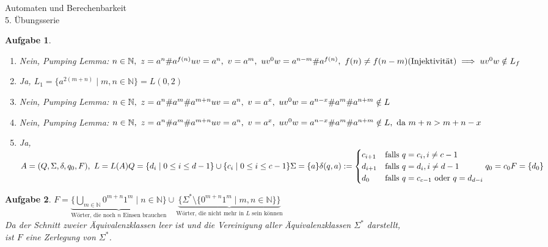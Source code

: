 \documentclass[11pt]{article}
\theoremstyle{break}
\newtheorem{task}{Aufgabe}
\begin{document}
\begin{center}
\Large{Automaten und Berechenbarkeit}\\
\large{5. Übungsserie}
\end{center}

\begin{task}
    \hfill\vspace{-5mm}
    \begin{enumerate} [label={(\alph*)}]
        \item Nein, Pumping Lemma: $n\in \mathbb{N},\ z = a^n \# a^{f(n)}\\ uv = a^n,\ v = a^m,\ uv^0 w = a^{n-m}\# a^{f(n)},\ f(n)\neq f(n-m)(\text{Injektivität})\implies uv^0 w \notin L_f$
        \item Ja, $L_1 = \{ a^{2(m+n)}\mid m,n\in \mathbb{N} \} = L(0,2)$
        \item Nein, Pumping Lemma: $n\in \mathbb{N},\ z = a^n\# a^m\# a^{m+n}\\ uv = a^n,\ v = a^x,\ uv^0 w = a^{n-x}\# a^m\# a^{n+m}\notin L$
        \item Nein, Pumping Lemma: $n\in \mathbb{N},\ z = a^n\# a^m\# a^{m+n}\\ uv = a^n,\ v = a^x,\ uv^0 w = a^{n-x}\# a^m\# a^{n+m}\notin L,\text{ da } m+n > m+n-x$
        \item Ja, $A = (Q, \Sigma, \delta, q_0, F),\ L = L(A) \vspace{2mm}\\
        Q = \{ d_i\mid 0\leq i\leq d-1 \}\cup \{ c_{i}\mid 0\leq i\leq c-1 \}\\
        \Sigma = \{a\}\\
        \delta(q, a) := \begin{cases}
            c_{i+1} & \text{falls } q = c_i, i\neq c-1\\
            d_{i+1} & \text{falls } q = d_i, i\neq d-1\\
            d_{0} & \text{falls } q = c_{c-1}\text{ oder } q = d_{d-i}
        \end{cases}\\
        q_0 = c_0 \\
        F = \{ d_0 \}\vspace{2mm}$
    \end{enumerate}
\end{task}

\begin{task}
    $F = \underbrace{\{\bigcup_{m\in \mathbb{N}} 0^{m+n} 1^{m}\mid n\in\mathbb{N}\}}_{\text{Wörter, die noch } n \text{ Einsen brauchen}}\cup \underbrace{\{\Sigma^*\setminus \{ 0^{m+n} 1^{m}\mid m,n\in\mathbb{N}\}\}}_{\text{Wörter, die nicht mehr in } L \text{ sein können}}$\\
    Da der Schnitt zweier Äquivalenzklassen leer ist und die Vereinigung aller Äquivalenzklassen $\Sigma^*$ darstellt,\\ist $F$ eine Zerlegung von $\Sigma^*$.
\end{task}
\end{document}
